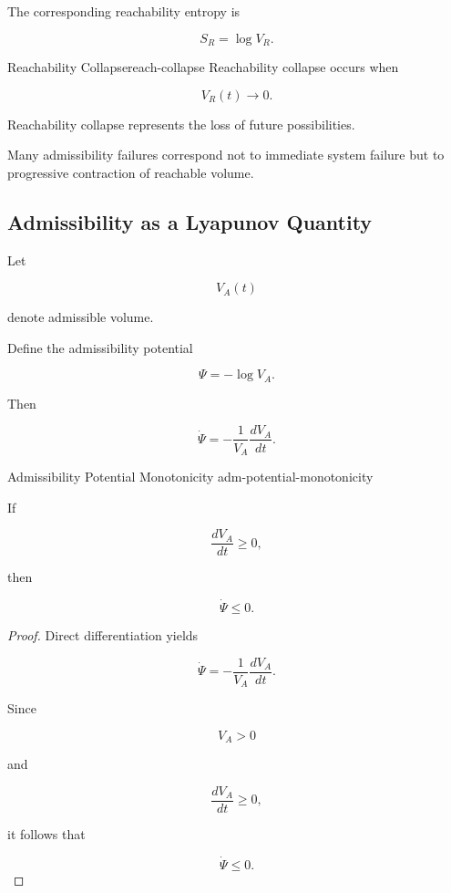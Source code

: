 \documentclass[12pt,twoside,openright]{book}
\begin{document}
The corresponding reachability entropy is

\[
S_R
=

\log V_R.
\]

\begin{definition}{Reachability Collapse}{reach-collapse}
Reachability collapse occurs when

\[
V_R(t)\rightarrow0.
\]
\end{definition}

Reachability collapse represents the loss of future
possibilities.

Many admissibility failures correspond not to immediate
system failure but to progressive contraction of
reachable volume.

\subsection{Admissibility as a Lyapunov Quantity}

Let

\[
V_A(t)
\]

denote admissible volume.

Define the admissibility potential

\[
\Psi
=

-\log V_A.
\]

Then

\[
\dot\Psi
=

-\frac{1}{V_A}
\frac{dV_A}{dt}.
\]

\begin{proposition}{Admissibility Potential Monotonicity}
  {adm-potential-monotonicity}

If

\[
\frac{dV_A}{dt}
\ge0,
\]

then

\[
\dot\Psi\le0.
\]
\end{proposition}

\begin{proof}
Direct differentiation yields

\[
\dot\Psi
=

-\frac1{V_A}
\frac{dV_A}{dt}.
\]

Since

\[
V_A>0
\]

and

\[
\frac{dV_A}{dt}\ge0,
\]

it follows that

\[
\dot\Psi\le0.
\]
\end{proof}
\end{document}
